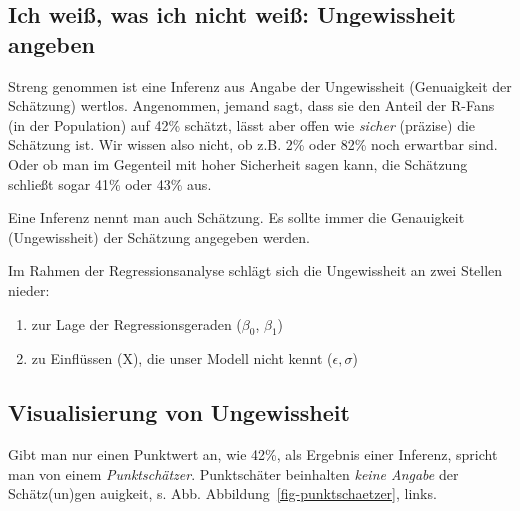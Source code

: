 \documentclass[
  a4paper,
  DIV=11]{scrreprt}
\providecommand{\tightlist}{%
  \setlength{\itemsep}{0pt}\setlength{\parskip}{0pt}}\usepackage{longtable,booktabs,array}
\theoremstyle{definition}
\theoremstyle{remark}
\begin{document}
\hypertarget{ich-weiuxdf-was-ich-nicht-weiuxdf-ungewissheit-angeben}{%
\subsection{Ich weiß, was ich nicht weiß: Ungewissheit
angeben}\label{ich-weiuxdf-was-ich-nicht-weiuxdf-ungewissheit-angeben}}

Streng genommen ist eine Inferenz aus Angabe der Ungewissheit
(Genuaigkeit der Schätzung) wertlos. Angenommen, jemand sagt, dass sie
den Anteil der R-Fans (in der Population) auf 42\% schätzt, lässt aber
offen wie \emph{sicher} (präzise) die Schätzung ist. Wir wissen also
nicht, ob z.B. 2\% oder 82\% noch erwartbar sind. Oder ob man im
Gegenteil mit hoher Sicherheit sagen kann, die Schätzung schließt sogar
41\% oder 43\% aus.

\begin{tcolorbox}[enhanced jigsaw, colframe=quarto-callout-important-color-frame, title=\textcolor{quarto-callout-important-color}{\faExclamation}\hspace{0.5em}{Wichtig}, breakable, leftrule=.75mm, coltitle=black, toptitle=1mm, bottomrule=.15mm, bottomtitle=1mm, opacityback=0, arc=.35mm, rightrule=.15mm, left=2mm, colbacktitle=quarto-callout-important-color!10!white, opacitybacktitle=0.6, toprule=.15mm, titlerule=0mm, colback=white]
Eine Inferenz nennt man auch Schätzung. Es sollte immer die Genauigkeit
(Ungewissheit) der Schätzung angegeben werden.
\end{tcolorbox}

Im Rahmen der Regressionsanalyse schlägt sich die Ungewissheit an zwei
Stellen nieder:

\begin{enumerate}
\def\labelenumi{\arabic{enumi}.}
\tightlist
\item
  zur Lage der Regressionsgeraden (\(\beta_0\), \(\beta_1\))
\item
  zu Einflüssen (X), die unser Modell nicht kennt (\(\epsilon, \sigma\))
\end{enumerate}

\hypertarget{visualisierung-von-ungewissheit}{%
\subsection{Visualisierung von
Ungewissheit}\label{visualisierung-von-ungewissheit}}

Gibt man nur einen Punktwert an, wie 42\%, als Ergebnis einer Inferenz,
spricht man von einem \emph{Punktschätzer}. Punktschäter beinhalten
\emph{keine Angabe} der Schätz(un)gen auigkeit, s. Abb.
Abbildung~\ref{fig-punktschaetzer}, links.
\end{document}
